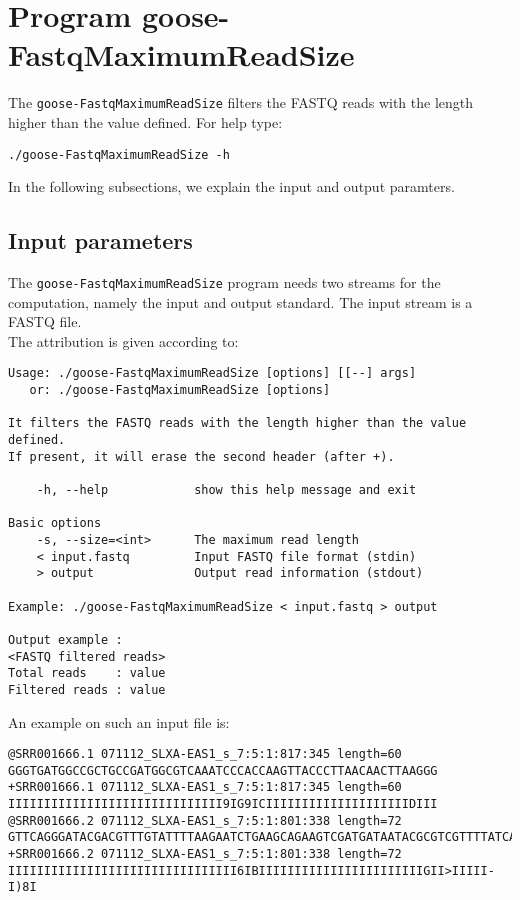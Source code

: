 \section{Program goose-FastqMaximumReadSize}
The \texttt{goose-FastqMaximumReadSize} filters the FASTQ reads with the length higher than the value defined.
For help type:
\begin{lstlisting}
./goose-FastqMaximumReadSize -h
\end{lstlisting}
In the following subsections, we explain the input and output paramters.

\subsection*{Input parameters}

The \texttt{goose-FastqMaximumReadSize} program needs two streams for the computation,
namely the input and output standard. The input stream is a FASTQ file.\\
The attribution is given according to:
\begin{lstlisting}
Usage: ./goose-FastqMaximumReadSize [options] [[--] args]
   or: ./goose-FastqMaximumReadSize [options]

It filters the FASTQ reads with the length higher than the value defined. 
If present, it will erase the second header (after +).

    -h, --help            show this help message and exit

Basic options
    -s, --size=<int>      The maximum read length
    < input.fastq         Input FASTQ file format (stdin)
    > output              Output read information (stdout)

Example: ./goose-FastqMaximumReadSize < input.fastq > output

Output example :
<FASTQ filtered reads>
Total reads    : value
Filtered reads : value
\end{lstlisting}
An example on such an input file is:
\begin{lstlisting}
@SRR001666.1 071112_SLXA-EAS1_s_7:5:1:817:345 length=60
GGGTGATGGCCGCTGCCGATGGCGTCAAATCCCACCAAGTTACCCTTAACAACTTAAGGG
+SRR001666.1 071112_SLXA-EAS1_s_7:5:1:817:345 length=60
IIIIIIIIIIIIIIIIIIIIIIIIIIIIII9IG9ICIIIIIIIIIIIIIIIIIIIIDIII
@SRR001666.2 071112_SLXA-EAS1_s_7:5:1:801:338 length=72
GTTCAGGGATACGACGTTTGTATTTTAAGAATCTGAAGCAGAAGTCGATGATAATACGCGTCGTTTTATCAT
+SRR001666.2 071112_SLXA-EAS1_s_7:5:1:801:338 length=72
IIIIIIIIIIIIIIIIIIIIIIIIIIIIIIII6IBIIIIIIIIIIIIIIIIIIIIIIIGII>IIIII-I)8I
\end{lstlisting}

